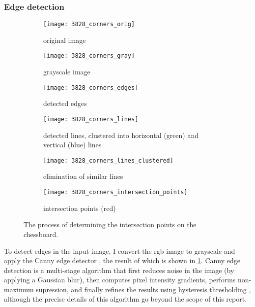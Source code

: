 \documentclass[../report.tex]{subfiles}
\begin{document}
\subsubsection{Edge detection}
\begin{figure}
    \centering
    \begin{subfigure}[t]{0.47\textwidth}
        \centering
        \texttt{[image: 3828\_corners\_orig]}
        \caption{original image}
    \end{subfigure}
    \hfill
    \begin{subfigure}[t]{0.47\textwidth}
        \centering
        \texttt{[image: 3828\_corners\_gray]}
        \caption{grayscale image}
    \end{subfigure}
    \bigskip
    \begin{subfigure}[t]{0.47\textwidth}
        \centering
        \texttt{[image: 3828\_corners\_edges]}
        \caption{detected edges}
        \label{fig:board_localisation_line_detection_edges}
    \end{subfigure}
    \hfill
    \begin{subfigure}[t]{0.47\textwidth}
        \centering
        \texttt{[image: 3828\_corners\_lines]}
        \caption{detected lines, clustered into horizontal (green) and vertical (blue) lines}
        \label{fig:board_localisation_line_detection_horizontal_vertical}
    \end{subfigure}
    \bigskip
    \begin{subfigure}[t]{0.47\textwidth}
        \centering
        \texttt{[image: 3828\_corners\_lines\_clustered]}
        \caption{elimination of similar lines}
        \label{fig:board_localisation_line_detection_elimination}
    \end{subfigure}
    \hfill
    \begin{subfigure}[t]{0.47\textwidth}
        \centering
        \texttt{[image: 3828\_corners\_intersection\_points]}
        \caption{intersection points (red)}
        \label{fig:board_localisation_line_detection_intersections}
    \end{subfigure}
    \caption{The process of determining the intersection points on the chessboard.}
    \label{fig:board_localisation_line_detection}
\end{figure}
To detect edges in the input image, I convert the \gls{rgb} image to grayscale and apply the Canny edge detector \cite{canny1986}, the result of which is shown in \cref{fig:board_localisation_line_detection_edges}.
Canny edge detection is a multi-stage algorithm that first reduces noise in the image (by applying a Gaussian blur), then computes pixel intensity gradients, performs non-maximum supression, and finally refines the results using hysteresis thresholding \cite{canny1986}, although the precise details of this algorithm go beyond the scope of this report.
\end{document}
